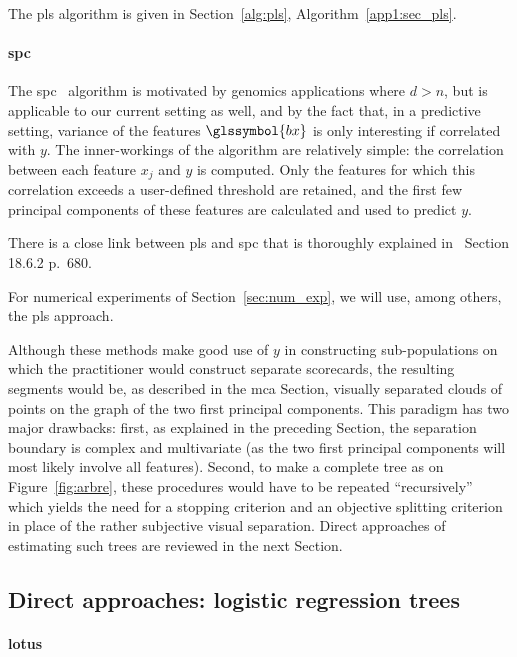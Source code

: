 The \gls{pls} algorithm is given in Section~\ref{alg:pls}, Algorithm~\ref{app1:sec_pls}.

\paragraph{\gls{spc}}

The \gls{spc}~\cite{bair2006prediction} algorithm is motivated by genomics applications where $d > n$, but is applicable to our current setting as well, and by the fact that, in a predictive setting, variance of the features $\glssymbol{bx}$ is only interesting if correlated with $y$. The inner-workings of the algorithm are relatively simple: the correlation between each feature $x_j$ and $y$ is computed. Only the features for which this correlation exceeds a user-defined threshold are retained, and the first few principal components of these features are calculated and used to predict $y$.

There is a close link between \gls{pls} and \gls{spc} that is thoroughly explained in~\cite{friedman2001elements} Section 18.6.2 p.\ 680.

For numerical experiments of Section~\ref{sec:num_exp}, we will use, among others, the \gls{pls} approach.

Although these methods make good use of $y$ in constructing sub-populations on which the practitioner would construct separate scorecards, the resulting segments would be, as described in the \gls{mca} Section, visually separated clouds of points on the graph of the two first principal components. This paradigm has two major drawbacks: first, as explained in the preceding Section, the separation boundary is complex and multivariate (as the two first principal components will most likely involve all features). Second, to make a complete tree as on Figure~\ref{fig:arbre}, these procedures would have to be repeated ``recursively'' which yields the need for a stopping criterion and an objective splitting criterion in place of the rather subjective visual separation. Direct approaches of estimating such trees are reviewed in the next Section.

\subsection{Direct approaches: logistic regression trees} \label{subsec:sup_gen}

\paragraph{\gls{lotus}}

